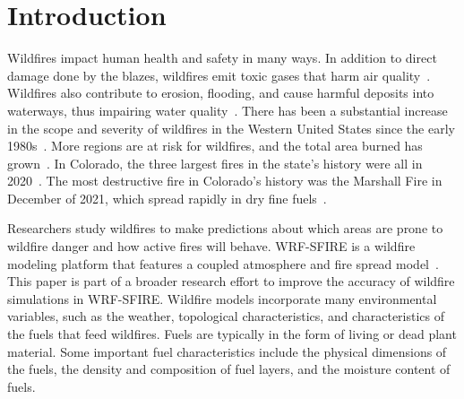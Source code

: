 \documentclass[fire,article,submit,pdftex,moreauthors]{Definitions/mdpi}
\begin{document}


\section{Introduction}

Wildfires impact human health and safety in many ways. In addition to direct damage done by the blazes, wildfires emit toxic gases that harm air quality~\citep{WHO-2024-WFS}. Wildfires also contribute to erosion, flooding, and cause harmful deposits into waterways, thus impairing water quality~\citep{USGS-2024-WQA}. There has been a substantial increase in the scope and severity of wildfires in the Western United States since the early 1980s~\citep{Cartier-2022-UFQ}. More regions are at risk for wildfires, and the total area burned has grown~\citep{IPCC-2021-LCI}. In Colorado, the three largest fires in the state's history were all in 2020~\citep{CDFPC-2024-HWI}. The most destructive fire in Colorado's history was the Marshall Fire in December of 2021, which spread rapidly in dry fine fuels~\citep{Juliano-2023-TBU}. 

Researchers study wildfires to make predictions about which areas are prone to wildfire danger and how active fires will behave. WRF-SFIRE is a wildfire modeling platform that features a coupled atmosphere and fire spread model~\citep{Mandel-2014-RAA}. This paper is part of a broader research effort to improve the accuracy of wildfire simulations in WRF-SFIRE. Wildfire models incorporate many environmental variables, such as the weather, topological characteristics, and characteristics of the fuels that feed wildfires. Fuels are typically in the form of living or dead plant material. Some important fuel characteristics include the physical dimensions of the fuels, the density and composition of fuel layers, and the moisture content of fuels.
\end{document}
